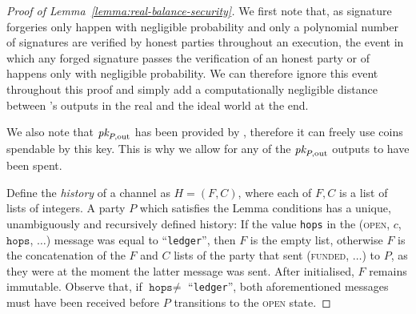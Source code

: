\begin{proof}[Proof of Lemma~\ref{lemma:real-balance-security}]
  We first note that, as signature forgeries only happen with negligible
  probability and only a polynomial number of signatures are verified by honest
  parties throughout an execution, the event in which any forged signature
  passes the verification of an honest party or of \ledger happens only with
  negligible probability. We can therefore ignore this event throughout this
  proof and simply add a computationally negligible distance between
  \environment's outputs in the real and the ideal world at the end.

  We also note that $\textit{pk}_{P, \mathrm{out}}$ has been provided by \environment,
  therefore it can freely use coins spendable by this key. This is why we allow
  for any of the $\textit{pk}_{P, \mathrm{out}}$ outputs to have been spent.

  Define the \emph{history} of a channel as $H = (F, C)$, where each of $F, C$
  is a list of lists of integers. A party $P$ which satisfies the Lemma
  conditions has a unique, unambiguously and recursively defined history: If the
  value \texttt{hops} in the (\textsc{open}, $c$, $\texttt{hops}$, $\dots$)
  message was equal to ``\texttt{ledger}'', then $F$ is the empty list, otherwise $F$ is the
  concatenation of the $F$ and $C$ lists of the party that sent
  (\textsc{funded}, $\dots$) to $P$, as they were at the moment the latter
  message was sent. After initialised, $F$ remains immutable. Observe that, if
  $\texttt{hops} \neq$ ``\texttt{ledger}'', both aforementioned messages must have been
  received before $P$ transitions to the \textsc{open} state.


\end{proof}
